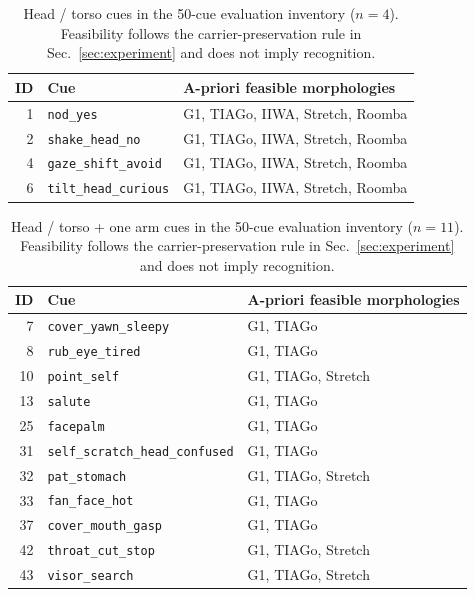 \begin{table}[t]
\centering
\scriptsize
\setlength{\tabcolsep}{3pt}
\renewcommand{\arraystretch}{1.05}
\begin{tabularx}{\columnwidth}{@{}r>{\raggedright\arraybackslash}X>{\raggedright\arraybackslash}p{2.3cm}@{}}
\toprule
\textbf{ID} & \textbf{Cue} & \textbf{A-priori feasible morphologies} \\
\midrule
1 & \texttt{nod\_yes} & G1, TIAGo, IIWA, Stretch, Roomba \\
2 & \texttt{shake\_head\_no} & G1, TIAGo, IIWA, Stretch, Roomba \\
4 & \texttt{gaze\_shift\_avoid} & G1, TIAGo, IIWA, Stretch, Roomba \\
6 & \texttt{tilt\_head\_curious} & G1, TIAGo, IIWA, Stretch, Roomba \\
\bottomrule
\end{tabularx}
\caption{Head / torso cues in the 50-cue evaluation inventory ($n=4$). Feasibility follows the carrier-preservation rule in Sec.~\ref{sec:experiment} and does not imply recognition.}
\label{tab:cue-inventory-50-1}
\end{table}

\begin{table}[t]
\centering
\scriptsize
\setlength{\tabcolsep}{3pt}
\renewcommand{\arraystretch}{1.05}
\begin{tabularx}{\columnwidth}{@{}r>{\raggedright\arraybackslash}X>{\raggedright\arraybackslash}p{2.3cm}@{}}
\toprule
\textbf{ID} & \textbf{Cue} & \textbf{A-priori feasible morphologies} \\
\midrule
7 & \texttt{cover\_yawn\_sleepy} & G1, TIAGo \\
8 & \texttt{rub\_eye\_tired} & G1, TIAGo \\
10 & \texttt{point\_self} & G1, TIAGo, Stretch \\
13 & \texttt{salute} & G1, TIAGo \\
25 & \texttt{facepalm} & G1, TIAGo \\
31 & \texttt{self\_scratch\_head\_confused} & G1, TIAGo \\
32 & \texttt{pat\_stomach} & G1, TIAGo, Stretch \\
33 & \texttt{fan\_face\_hot} & G1, TIAGo \\
37 & \texttt{cover\_mouth\_gasp} & G1, TIAGo \\
42 & \texttt{throat\_cut\_stop} & G1, TIAGo, Stretch \\
43 & \texttt{visor\_search} & G1, TIAGo, Stretch \\
\bottomrule
\end{tabularx}
\caption{Head / torso + one arm cues in the 50-cue evaluation inventory ($n=11$). Feasibility follows the carrier-preservation rule in Sec.~\ref{sec:experiment} and does not imply recognition.}
\label{tab:cue-inventory-50-2}
\end{table}

